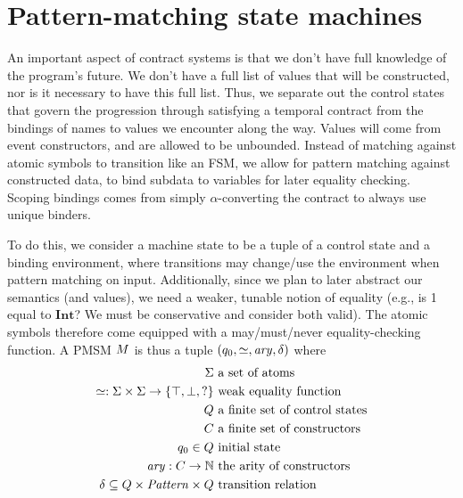 \section{Pattern-matching state machines}
\FloatBarrier

An important aspect of contract systems is that we don't have full knowledge of the program's future.
%
We don't have a full list of values that will be constructed, nor is it necessary to have this full list.
%
Thus, we separate out the control states that govern the progression through satisfying a temporal contract from the bindings of names to values we encounter along the way.
%
Values will come from event constructors, and are allowed to be unbounded.
%
Instead of matching against atomic symbols to transition like an FSM, we allow for pattern matching against constructed data, to bind subdata to variables for later equality checking.
%
Scoping bindings comes from simply $\alpha$-converting the contract to always use unique binders.
%

To do this, we consider a machine state to be a tuple of a control state and a binding environment, where transitions may change/use the environment when pattern matching on input.
%
Additionally, since we plan to later abstract our semantics (and values), we need a weaker, tunable notion of equality (e.g., is 1 equal to $\mathbf{Int}$? We must be conservative and consider both valid).
%
The atomic symbols therefore come equipped with a may/must/never equality-checking function.
%
A PMSM $M$ is thus a tuple $(q_0, \simeq, \mathit{ary}, \delta)$ where
\begin{align*}
  \Sigma &\text{ a set of atoms} \\
  \simeq : \Sigma \times \Sigma \to \{\top, \bot, ?\} &\text{ weak equality function}\\
  Q &\text{ a finite set of control states} \\
  C &\text{ a finite set of constructors} \\
  q_0 \in Q &\text{ initial state} \\
  \mathit{ary} : C \to {\mathbb N}&\text{ the arity of constructors} \\
  \delta \subseteq Q \times \mathit{Pattern} \times Q & \text{ transition relation}\\[2pt]
\end{align*}

